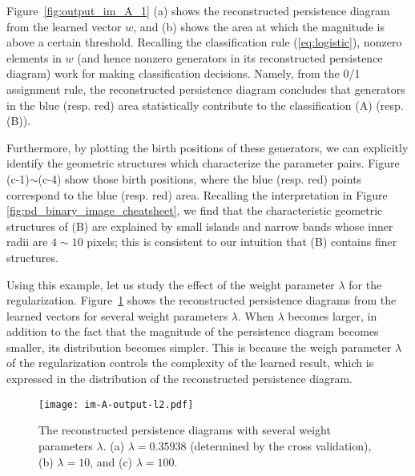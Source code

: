 \documentclass[smallextended]{svjour3}
\begin{document}
Figure~\ref{fig:output_im_A_1} (a) shows the reconstructed persistence diagram from the learned vector $w$, and (b) shows the area at which the magnitude is above a certain threshold. Recalling the classification rule (\ref{eq:logistic}), nonzero elements in $w$ (and hence nonzero generators in its reconstructed persistence diagram) work for making classification decisions. Namely, from the 0/1 assignment rule, the reconstructed persistence diagram concludes that generators in the blue (resp. red) area statistically contribute to the classification (A) (resp. (B)). 




Furthermore, by plotting the birth positions of these generators, we can explicitly identify the geometric structures which characterize the parameter pairs. Figure (c-1)$\sim$(c-4) show those birth positions, where the blue (resp. red) points correspond to the blue (resp. red) area. Recalling the interpretation in Figure \ref{fig:pd_binary_image_cheatsheet}, we find that the characteristic geometric structures of (B) are explained by small islands and narrow bands  whose inner radii are $4\sim 10$ pixels; this is consistent to our intuition that (B) contains finer structures. 




Using this example, let us study the effect of the weight parameter $\lambda$ for the regularization. Figure~\ref{fig:output_im_A_l2} shows the reconstructed persistence diagrams from the learned vectors for several weight parameters $\lambda$. When $\lambda$ becomes larger, in addition to the fact that the magnitude of the persistence diagram becomes smaller, its distribution becomes simpler. This is because the weigh parameter $\lambda$ of the regularization controls the complexity of the learned result, which is expressed in the distribution of the reconstructed persistence diagram.

\begin{figure}[htbp]
  \centering
  \texttt{[image: im-A-output-l2.pdf]}
  \caption{The reconstructed persistence diagrams with several weight parameters $\lambda$.
    (a) $\lambda = 0.35938$ (determined by the cross validation), (b) $\lambda=10$, and  (c) $\lambda = 100$.
  }
  \label{fig:output_im_A_l2}
\end{figure}
\end{document}
